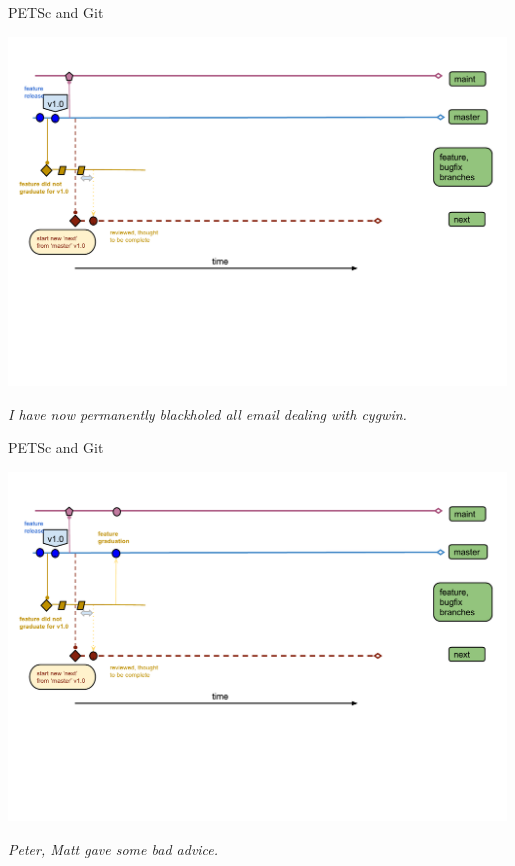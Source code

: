 \begin{frame}{PETSc and Git}
  \begin{center}
    \includegraphics[width=0.99\textwidth]{figures/gitworkflows-58}
  \end{center}
  \begin{flushright} \vspace*{-0.5cm}
   \textit{I have now permanently blackholed all email dealing with cygwin.}
  \end{flushright}
\end{frame}

\begin{frame}{PETSc and Git}
  \begin{center}
    \includegraphics[width=0.99\textwidth]{figures/gitworkflows-60}
  \end{center}
  \begin{flushright} \vspace*{-0.5cm}
   \textit{Peter, Matt gave some bad advice.}
  \end{flushright}
\end{frame}

